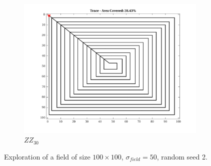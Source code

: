 \begin{figure}[htb!]
    \begin{subfigure}[t]{0.25\textwidth}
        \centering
        \includegraphics[width=\linewidth]{figures/path_zz_30p_100x100_sf_50_seed_2.png}
        \captionsetup{skip=0.20\baselineskip,size=footnotesize}
        \caption{$ZZ_{30}$}
    \end{subfigure}%
    \captionsetup{skip=0.20\baselineskip}
    \caption{Exploration of a field of size $100 \times 100$, $\sigma_{field} = 50$, random seed 2.}
    \label{fig:sf50}
\end{figure}


